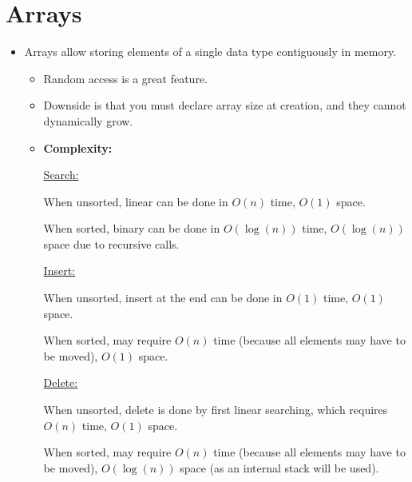 \documentclass[12pt]{article}
\newcommand{\uln}[1]{{\noindent\ul{#1}}}
\newcommand{\vsp}{\vspace{0.75mm}}
\begin{document}
	\section*{Arrays}
	\label{sec:Arrays}
	\begin{itemize}
		\item Arrays allow storing elements of a single data type contiguously in memory.
		\begin{itemize}
			\item Random access is a great feature.
			\item Downside is that you must declare array size at creation, and they cannot dynamically grow.
			\item \textbf{Complexity:}
			
			\vsp
			
			\uln{Search:} 
			
			When unsorted, linear can be done in $O(n)$ time, $O(1)$ space.
			
			When sorted, binary can be done in $O(\log(n))$ time, $O(\log(n))$ space due to recursive calls.\vsp
			
			\uln{Insert:} 
			
			When unsorted, insert at the end can be done in $O(1)$ time, $O(1)$ space.
			
			When sorted, may require $O(n)$ time (because all elements may have to be moved), $O(1)$ space.\vsp
			
			\uln{Delete:} 
			
			When unsorted, delete is done by first linear searching, which requires $O(n)$ time, $O(1)$ space.
			
			When sorted, may require $O(n)$ time (because all elements may have to be moved), $O(\log(n))$ space (as an internal stack will be used).
		\end{itemize}
	\end{itemize}
\end{document}
